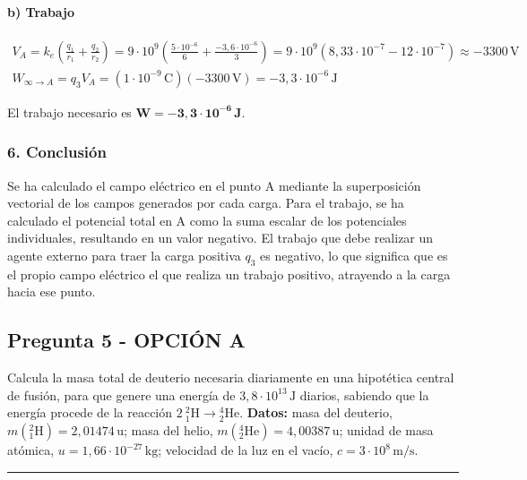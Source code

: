 \paragraph{b) Trabajo}
\begin{gather}
    V_A = k_e \left(\frac{q_1}{r_1} + \frac{q_2}{r_2}\right) = 9\cdot 10^9 \left(\frac{5 \cdot 10^{-6}}{6} + \frac{-3,6 \cdot 10^{-6}}{3}\right) = 9\cdot 10^9 (8,33\cdot 10^{-7} - 12\cdot 10^{-7}) \approx -3300\,\text{V} \\
    W_{\infty \to A} = q_3 V_A = (1 \cdot 10^{-9}\,\text{C})(-3300\,\text{V}) = -3,3 \cdot 10^{-6}\,\text{J}
\end{gather}
\begin{cajaresultado}
    El trabajo necesario es $\boldsymbol{W = -3,3 \cdot 10^{-6}\,\textbf{J}}$.
\end{cajaresultado}

\subsubsection*{6. Conclusión}
\begin{cajaconclusion}
Se ha calculado el campo eléctrico en el punto A mediante la superposición vectorial de los campos generados por cada carga. Para el trabajo, se ha calculado el potencial total en A como la suma escalar de los potenciales individuales, resultando en un valor negativo. El trabajo que debe realizar un agente externo para traer la carga positiva $q_3$ es negativo, lo que significa que es el propio campo eléctrico el que realiza un trabajo positivo, atrayendo a la carga hacia ese punto.
\end{cajaconclusion}

\newpage

\subsection{Pregunta 5 - OPCIÓN A}
\label{subsec:5A_2015_jun_ord}

\begin{cajaenunciado}
Calcula la masa total de deuterio necesaria diariamente en una hipotética central de fusión, para que genere una energía de $3,8\cdot10^{13}\,\text{J}$ diarios, sabiendo que la energía procede de la reacción $2\ {}_{1}^{2}\text{H} \to {}_{2}^{4}\text{He}$.
\textbf{Datos:} masa del deuterio, $m({}_{1}^{2}\text{H})=2,01474\,\text{u}$; masa del helio, $m({}_{2}^{4}\text{He})=4,00387\,\text{u}$; unidad de masa atómica, $u=1,66\cdot10^{-27}\,\text{kg}$; velocidad de la luz en el vacío, $c=3\cdot10^{8}\,\text{m/s}$.
\end{cajaenunciado}
\hrule

